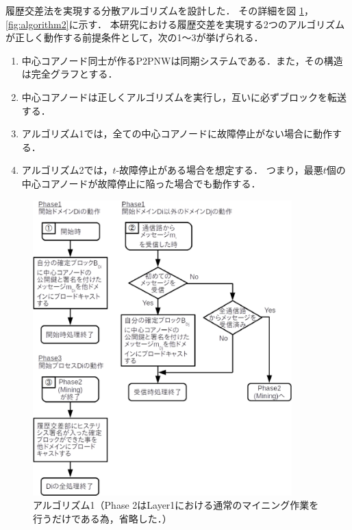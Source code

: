 \documentclass[a4paper,12pt]{jsarticle}
\begin{document}
履歴交差法を実現する分散アルゴリズム\cite{manabe}を設計した．
その詳細を図 \ref{fig:algorithm1}，\ref{fig:algorithm2}に示す．
本研究における履歴交差を実現する2つのアルゴリズムが正しく動作する前提条件として，次の1〜3が挙げられる．

\hspace{3mm}
%
\begin{enumerate}
  \item 中心コアノード同士が作るP2PNWは同期システムである．また，その構造は完全グラフとする．
  
  \item 中心コアノードは正しくアルゴリズムを実行し，互いに必ずブロックを転送する．
  
  \item アルゴリズム1では，全ての中心コアノードに故障停止がない場合に動作する．
  
  \item アルゴリズム2では，$t$-故障停止がある場合を想定する．
        つまり，最悪$t$個の中心コアノードが故障停止に陥った場合でも動作する．
\end{enumerate}
%
\hspace{3mm}
%
\begin{figure}[H]%
  \begin{center}
    \includegraphics[width=100mm]{pht/flow_chart-algorithm1.eps}
  \end{center}
  \caption{アルゴリズム1（Phase 2はLayer1における通常のマイニング作業を行うだけである為，省略した．）}
  \label{fig:algorithm1}
\end{figure}
\end{document}

